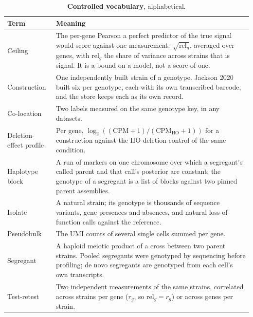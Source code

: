 \begin{table}[htbp]
\centering
\footnotesize
\caption[]{\textbf{Controlled vocabulary}, alphabetical.}
\label{tab:vocab}
\begin{tabular}{>{\raggedright\arraybackslash}p{30mm}>{\raggedright\arraybackslash}p{140mm}}
\toprule
Term & Meaning \\
\midrule
Ceiling & The per-gene Pearson a perfect predictor of the true signal would score
against one measurement: $\sqrt{\mathrm{rel}_g}$, averaged over genes, with
$\mathrm{rel}_g$ the share of variance across strains that is signal. It is a bound on a
model, not a score of one. \\
Construction & One independently built strain of a genotype. Jackson 2020 built six per
genotype, each with its own transcribed barcode, and the store keeps each as its own
record. \\
Co-location & Two labels measured on the same genotype key, in any datasets. \\
Deletion-effect profile & Per gene, $\log_2((\mathrm{CPM}+1)/(\mathrm{CPM}_{\mathrm{HO}}+1))$
for a construction against the HO-deletion control of the same condition. \\
Haplotype block & A run of markers on one chromosome over which a segregant's called
parent and that call's posterior are constant; the genotype of a segregant is a list of
blocks against two pinned parent assemblies. \\
Isolate & A natural strain; its genotype is thousands of sequence variants, gene
presences and absences, and natural loss-of-function calls against the reference. \\
Pseudobulk & The UMI counts of several single cells summed per gene. \\
Segregant & A haploid meiotic product of a cross between two parent strains. Pooled
segregants were genotyped by sequencing before profiling; de novo segregants are
genotyped from each cell's own transcripts. \\
Test-retest & Two independent measurements of the same strains, correlated across
strains per gene ($r_g$, so $\mathrm{rel}_g = r_g$) or across genes per strain. \\
\bottomrule
\end{tabular}
\end{table}

